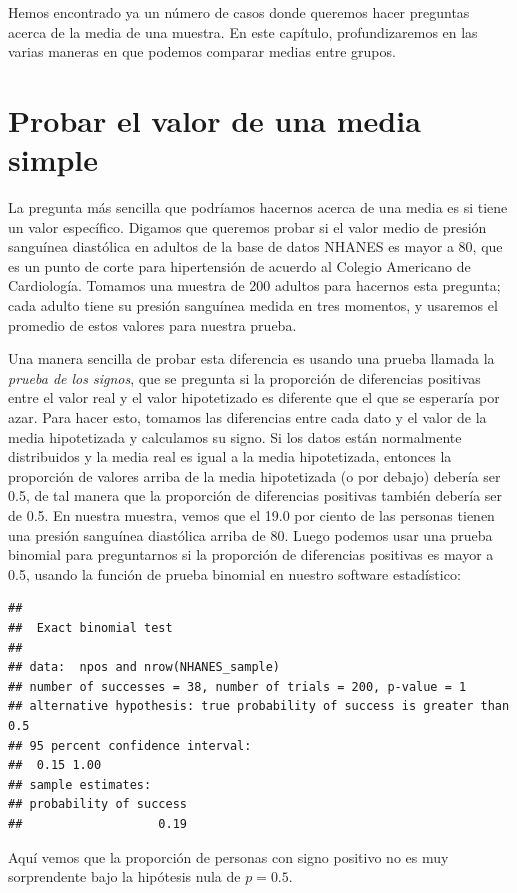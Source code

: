 \documentclass[
  12pt,
]{book}
\begin{document}
Hemos encontrado ya un número de casos donde queremos hacer preguntas acerca de la media de una muestra. En este capítulo, profundizaremos en las varias maneras en que podemos comparar medias entre grupos.

\hypertarget{single-mean}{%
\section{Probar el valor de una media simple}\label{single-mean}}

La pregunta más sencilla que podríamos hacernos acerca de una media es si tiene un valor específico. Digamos que queremos probar si el valor medio de presión sanguínea diastólica en adultos de la base de datos NHANES es mayor a 80, que es un punto de corte para hipertensión de acuerdo al Colegio Americano de Cardiología. Tomamos una muestra de 200 adultos para hacernos esta pregunta; cada adulto tiene su presión sanguínea medida en tres momentos, y usaremos el promedio de estos valores para nuestra prueba.

Una manera sencilla de probar esta diferencia es usando una prueba llamada la \emph{prueba de los signos}, que se pregunta si la proporción de diferencias positivas entre el valor real y el valor hipotetizado es diferente que el que se esperaría por azar. Para hacer esto, tomamos las diferencias entre cada dato y el valor de la media hipotetizada y calculamos su signo. Si los datos están normalmente distribuidos y la media real es igual a la media hipotetizada, entonces la proporción de valores arriba de la media hipotetizada (o por debajo) debería ser 0.5, de tal manera que la proporción de diferencias positivas también debería ser de 0.5. En nuestra muestra, vemos que el 19.0 por ciento de las personas tienen una presión sanguínea diastólica arriba de 80. Luego podemos usar una prueba binomial para preguntarnos si la proporción de diferencias positivas es mayor a 0.5, usando la función de prueba binomial en nuestro software estadístico:

\begin{verbatim}
## 
##  Exact binomial test
## 
## data:  npos and nrow(NHANES_sample)
## number of successes = 38, number of trials = 200, p-value = 1
## alternative hypothesis: true probability of success is greater than 0.5
## 95 percent confidence interval:
##  0.15 1.00
## sample estimates:
## probability of success 
##                   0.19
\end{verbatim}

Aquí vemos que la proporción de personas con signo positivo no es muy sorprendente bajo la hipótesis nula de \(p=0.5\).
\end{document}
